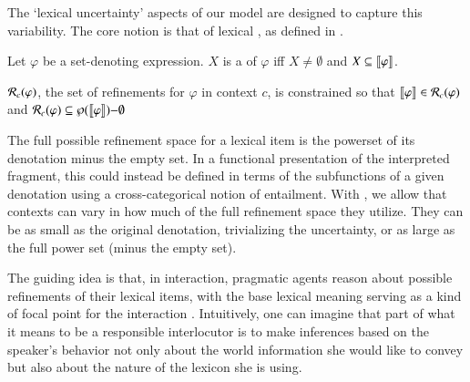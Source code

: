 \documentclass[leqno,12pt]{article}
\begin{document}
The `lexical uncertainty' aspects of our model are designed to capture
this variability. The core notion is that of lexical
, as defined in .
%
\begin{examples}
\item\label{refinement} 
  \begin{examples}
  \item Let $\varphi$ be a set-denoting expression. $X$ is a
     of $\varphi$ iff $X \neq \emptyset$ and
    $X \subseteq \llbracket\varphi\rrbracket$.
  \item\label{refine} $\mathcal{R}_{c}(\varphi)$, the set of refinements for
    $\varphi$ in context $c$, is constrained so that
    $\llbracket\varphi\rrbracket \in \mathcal{R}_{c}(\varphi)$ and
    $\mathcal{R}_{c}(\varphi) \subseteq \wp(\llbracket\varphi\rrbracket){-}\emptyset$
  \end{examples}
\end{examples}
%
The full possible refinement space for a lexical item is the powerset
of its denotation minus the empty set. In a functional presentation of
the interpreted fragment, this could instead be defined in terms of
the subfunctions of a given denotation using a cross-categorical
notion of entailment. With , we allow that
contexts can vary in how much of the full refinement space they
utilize. They can be as small as the original denotation, trivializing
the uncertainty, or as large as the full power set (minus the empty
set).

The guiding idea is that, in interaction, pragmatic agents reason
about possible refinements of their lexical items, with the base
lexical meaning serving as a kind of focal point for the interaction
\citep{Franke09DISS}.  Intuitively, one can imagine that part of what
it means to be a responsible interlocutor is to make inferences based
on the speaker's behavior not only about the world information she
would like to convey but also about the nature of the lexicon she is
using.
\end{document}

